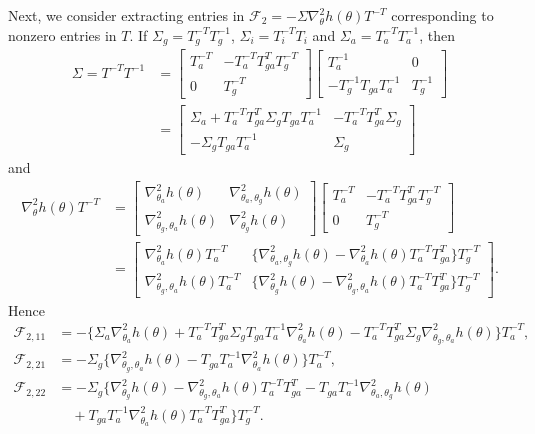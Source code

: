 \documentclass{statsoc}
\newcommand\F{{\mathcal{F}}}
\begin{document}
Next, we consider extracting entries in $\F_2 = -\Sigma \nabla_\theta^2 h(\theta) T^{-T}$ corresponding to nonzero entries in $T$. If $\Sigma_g = T_g^{-T} T_g^{-1}$, $\Sigma_i = T_i^{-T} T_i$ and $\Sigma_a = T_a^{-T} T_a^{-1}$, then  
\[
\begin{aligned}
\Sigma = T^{-T} T^{-1} 
&=  \begin{bmatrix} T_a^{-T} &  - T_a^{-T}  T_{ga}^T  T_g^{-T} \\ 0 & T_g^{-T} \end{bmatrix} \begin{bmatrix} T_a^{-1} & 0 \\ - T_g^{-1} T_{ga}  T_a^{-1} & T_g^{-1} \end{bmatrix} \\
&= \begin{bmatrix} \Sigma_a  + T_a^{-T}  T_{ga}^T  \Sigma_g T_{ga}  T_a^{-1} &  - T_a^{-T}  T_{ga}^T  \Sigma_g  \\[1mm]  - \Sigma_g T_{ga} T_a^{-1} & \Sigma_g  \end{bmatrix} 
\end{aligned} 
\]
and 
\[
\begin{aligned}
\nabla_\theta^2 h(\theta) T^{-T}& = \begin{bmatrix} \nabla_{\theta_a}^2 h(\theta)  &   \nabla_{\theta_a, \theta_g}^2 h(\theta)  \\  \nabla_{\theta_g, \theta_a}^2 h(\theta) &  \nabla_{\theta_g}^2 h(\theta)  \end{bmatrix}
\begin{bmatrix} T_a^{-T} &  - T_a^{-T}  T_{ga}^T  T_g^{-T} \\ 0 & T_g^{-T} \end{bmatrix} \\
&= \begin{bmatrix} \nabla_{\theta_a}^2 h(\theta) T_a^{-T}   &   \{\nabla_{\theta_a, \theta_g}^2 h(\theta) - \nabla_{\theta_a}^2 h(\theta) T_a^{-T} T_{ga}^T \} T_g^{-T}      \\  \nabla_{\theta_g, \theta_a}^2 h(\theta) T_a^{-T}   &  \{\nabla_{ \theta_g}^2 h(\theta) - \nabla_{\theta_g, \theta_a}^2 h(\theta) T_a^{-T} T_{ga}^T \} T_g^{-T}    \end{bmatrix}.
\end{aligned}
\]
Hence
\[
\begin{aligned}
\F_{2, 11} &=  - \{\Sigma_a \nabla_{\theta_a}^2 h(\theta)  + T_a^{-T} T_{ga}^T \Sigma_g T_{ga}  T_a^{-1} \nabla_{\theta_a}^2 h(\theta) - T_a^{-T} T_{ga}^T \Sigma_g  \nabla_{\theta_g, \theta_a}^2 h(\theta)  \} T_a^{-T},  \\
\F_{2,21} &= -  \Sigma_g \{\nabla_{\theta_g, \theta_a}^2 h(\theta) - T_{ga} T_a^{-1} \nabla_{\theta_a}^2 h(\theta) \} T_a^{-T}, \\
\F_{2,22} &= -  \Sigma_g \{ \nabla_{ \theta_g}^2 h(\theta)  - \nabla_{\theta_g, \theta_a}^2 h(\theta) T_a^{-T} T_{ga}^T -  T_{ga} T_a^{-1} \nabla_{\theta_a, \theta_g}^2 h(\theta)  \\
& \quad +  T_{ga} T_a^{-1} \nabla_{\theta_a}^2 h(\theta) T_a^{-T} T_{ga}^T \} T_g^{-T}.
\end{aligned}
\]
\end{document}
